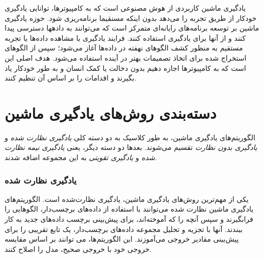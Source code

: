 


یادگیری ماشین کاربردی از هوش مصنوعی 
است که به کامپیوترها، توانایی یادگیری خودکار از طریق تجربه  را می‌دهد بدون اینکه مسنقیما برنامه‌ریزی شود. حوزه یادگیری ماشین بر توسعه برنامه‌های رایانه‌ای متمرکز است که می‌توانند به داده\nf ها دسترسی پیدا کنند و از آن\nf ها برای یادگیری استفاده کنند. فرایند یادگیری با مشاهده داده‌ها یا تجربه مستقیم  به منظور کشف الگوهای نهفته در داده‌ها آغاز می‌شود؛  سپس از الگوهای  استخراج شده برای اتخاذ تصمیمات بهتر در آینده استفاده می‌شود. هدف اصلی این است که به کامپیوترها اجازه دهیم بدون دخالت یا کمک انسان و به طور خودکار یاد بگیرند و اقدامات را بر اساس آن تنظیم کنند.

\section{دسته‌بندی روش‌های یادگیری ماشین}
الگوریتم‌های یادگیری ماشین، به طور کلاسیک به دو دسته کلی 
\textit{یادگیری نظارت شده}
و 
\textit{یادگیری بدون نظارت}
تقسیم می‌شوند. بعدها دو دسته دیگر، یعنی 
\textit{یادگیری نیمه نظارت شده}
و
\textit{یادگیری تقویتی}
  به این مجموعه اضافه شدند.
\subsubsection{یادگیری نظارت شده}

یکی از مهم‌ترین روش‌های یادگیری ماشین، یادگیری نظارت‌شده است. الگوریتم‌های یادگیری ماشین نظارت ‌شده می‌توانند  با استفاده از داده‌های برچسب‌دار، الگوهایی  را فرابگیرند و سپس آنچه را که آموخته‌اند، برای پیش‌بینی برچسب داده‌های جدید به کار ببندند. آن\nf ها با تجزیه و تحلیل مجموعه داده‌های برچسب‌دار، یک تابع تقریبی را برای پیش‌بینی مقادیر خروجی می‌‌آموزند. این الگوریتم‌ها، می \nf توانند بر اساس مقایسه خروجی خود با خروجی صحیح، مدل را اصلاح کنند.

